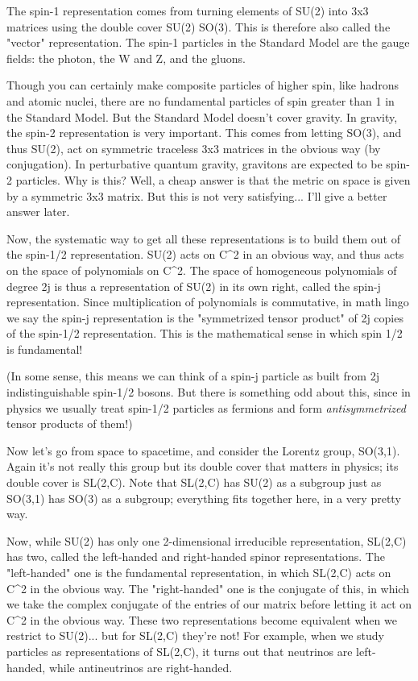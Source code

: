 The spin-1 representation comes from turning elements of SU(2) into 3x3
matrices using the double cover SU(2) \to  SO(3).  This is therefore also
called the "vector" representation.  The spin-1 particles in the
Standard Model are the gauge fields: the photon, the W and Z, and the
gluons.

Though you can certainly make composite particles of higher spin, like
hadrons and atomic nuclei, there are no fundamental particles of spin
greater than 1 in the Standard Model.  But the Standard Model doesn't
cover gravity.  In gravity, the spin-2 representation is very important.
This comes from letting SO(3), and thus SU(2), act on symmetric
traceless 3x3 matrices in the obvious way (by conjugation).  In
perturbative quantum gravity, gravitons are expected to be spin-2
particles.  Why is this?  Well, a cheap answer is that the metric on
space is given by a symmetric 3x3 matrix.  But this is not very
satisfying... I'll give a better answer later.

Now, the systematic way to get all these representations is to build
them out of the spin-1/2 representation.  SU(2) acts on C^2 in an
obvious way, and thus acts on the space of polynomials on C^2.  The
space of homogeneous polynomials of degree 2j is thus a representation
of SU(2) in its own right, called the spin-j representation.  Since
multiplication of polynomials is commutative, in math lingo we say the
spin-j representation is the "symmetrized tensor product" of 2j copies
of the spin-1/2 representation.  This is the mathematical sense in which
spin 1/2 is fundamental!

(In some sense, this means we can think of a spin-j particle as built
from 2j indistinguishable spin-1/2 bosons.  But there is something odd
about this, since in physics we usually treat spin-1/2 particles as
fermions and form \emph{antisymmetrized} tensor products of them!)

Now let's go from space to spacetime, and consider the Lorentz
group, SO(3,1).  Again it's not really this group but its double
cover that matters in physics; its double cover is SL(2,C).  Note
that SL(2,C) has SU(2) as a subgroup just as SO(3,1) has SO(3) as
a subgroup; everything fits together here, in a very pretty way.

Now, while SU(2) has only one 2-dimensional irreducible representation,
SL(2,C) has two, called the left-handed and right-handed spinor
representations.  The "left-handed" one is the fundamental
representation, in which SL(2,C) acts on C^2 in the obvious way.  The
"right-handed" one is the conjugate of this, in which we take the
complex conjugate of the entries of our matrix before letting it act on
C^2 in the obvious way.  These two representations become equivalent
when we restrict to SU(2)... but for SL(2,C) they're not!  For example,
when we study particles as representations of SL(2,C), it turns out that
neutrinos are left-handed, while antineutrinos are right-handed.  

